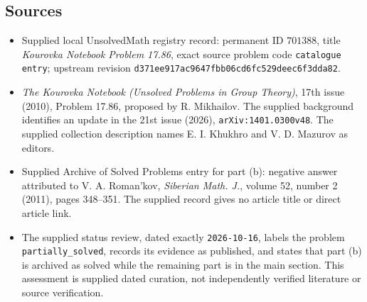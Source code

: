 \documentclass[11pt]{article}
\begin{document}
\subsection{Sources}
\begin{itemize}
\item Supplied local UnsolvedMath registry record: permanent ID \(701388\), title \emph{Kourovka Notebook Problem 17.86}, exact source problem code \texttt{catalogue entry}; upstream revision \texttt{d371ee917ac9647fbb06cd6fc529deec6f3dda82}.
\item \emph{The Kourovka Notebook (Unsolved Problems in Group Theory)}, 17th issue (2010), Problem 17.86, proposed by R. Mikhailov. The supplied background identifies an update in the 21st issue (2026), \texttt{arXiv:1401.0300v48}. The supplied collection description names E. I. Khukhro and V. D. Mazurov as editors.
\item Supplied Archive of Solved Problems entry for part (b): negative answer attributed to V. A. Roman'kov, \emph{Siberian Math. J.}, volume 52, number 2 (2011), pages 348--351. The supplied record gives no article title or direct article link.
\item The supplied status review, dated exactly \texttt{2026-10-16}, labels the problem \texttt{partially\_solved}, records its evidence as published, and states that part (b) is archived as solved while the remaining part is in the main section. This assessment is supplied dated curation, not independently verified literature or source verification.
\end{itemize}
\end{document}
